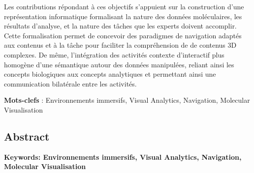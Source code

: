 Les contributions répondant à ces objectifs s'appuient sur la construction d'une représentation informatique formalisant la nature des données moléculaires, les résultats d'analyse, et la nature des tâches que les experts doivent accomplir. Cette formalisation permet de concevoir des paradigmes de navigation adaptés aux contenus et à la tâche pour faciliter la compréhension de de contenus 3D complexes.  De même, l'intégration des activités contexte d'interactif plus homogène d'une sémantique autour des données manipulées, reliant ainsi les concepts biologiques aux concepts analytiques et permettant ainsi une communication bilatérale entre les activités.

\textbf{Mots-clefs} : Environnements immersifs, Visual Analytics, Navigation, Molecular Visualisation


\begin{otherlanguage}{english}

%
  
\subsection*{Abstract}
  
\footnotesize

\textbf{Keywords: Environnements immersifs, Visual Analytics, Navigation, Molecular Visualisation} 

\end{otherlanguage} 